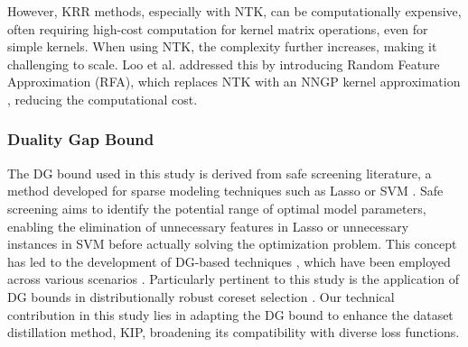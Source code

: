 However, KRR methods, especially with NTK, can be computationally expensive, often requiring 
high-cost computation for kernel matrix operations, even for simple kernels. When using NTK, the complexity further increases, making it challenging to scale. Loo et al. \cite{loo2022efficient} addressed this by introducing Random Feature Approximation (RFA), which replaces NTK with an NNGP kernel approximation \cite{lee2017deep}, reducing the computational cost.



\subsubsection{Duality Gap Bound}

The DG bound used in this study is derived from safe screening literature, a method developed for sparse modeling techniques such as Lasso or SVM \citep{ghaoui2010safe}.
%
Safe screening aims to identify the potential range of optimal model parameters, enabling the elimination of unnecessary features in Lasso \citep{wang2013lasso,ndiaye2017gap} or unnecessary instances in SVM \citep{ogawa2014safe,shibagaki2016simultaneous} before actually solving the optimization problem.
%
This concept has led to the development of DG-based techniques \citep{ndiaye2015gap}, which have been employed across various scenarios \citep{ndiaye2015gap,nakagawa2016safe,hanada2018efficiently,hanada2023generalized,zhai2020safe,dantas2021expanding}.
%
Particularly pertinent to this study is the application of DG bounds in distributionally robust coreset selection \citep{hanada2024distributionally,tanaka2025distributionally}.
%
Our technical contribution in this study lies in adapting the DG bound to enhance the dataset distillation method, KIP, broadening its compatibility with diverse loss functions.
